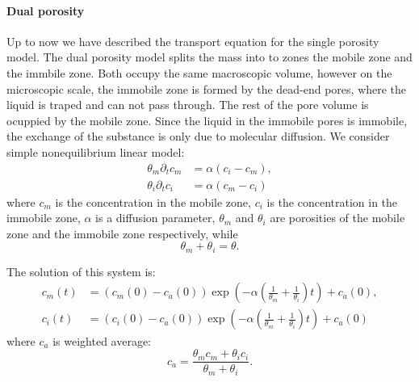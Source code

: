 \paragraph{Dual porosity}
Up to now we have described the transport equation for the single porosity model. The dual porosity model splits the mass into to zones the mobile zone and the immbile zone. 
Both occupy the same macroscopic volume, however on the microscopic scale, the immobile zone is formed by the dead-end pores, where the liquid is traped and can not pass through.
The rest of the pore volume is ocuppied by the mobile zone. Since the liquid in the immobile pores is immobile, the exchange of the substance is only due to molecular diffusion.
We consider simple nonequilibrium linear model:
\begin{align}
    \theta_m \partial_t c_m &= \alpha ( c_i - c_m), \\
    \theta_i \partial_t c_i &= \alpha ( c_m - c_i) 
\end{align}
where $c_m$ is the concentration in the mobile zone, $c_i$ is the concentration in the immobile zone, $\alpha$ is a diffusion parameter, $\theta_m$ and $\theta_i$ are porosities of the mobile zone and the immobile zone respectively, while 
\[
  \theta_m +\theta_i =\theta.
\]

The solution of this system is:
\begin{align}
     c_m(t) &= (c_m(0) - c_a(0)) \exp(- \alpha(\frac{1}{\theta_m} + \frac{1}{\theta_i}) t) + c_a(0), \\
     c_i(t) &= (c_i(0) - c_a(0)) \exp(- \alpha(\frac{1}{\theta_m} + \frac{1}{\theta_i}) t) + c_a(0)
\end{align}
where $c_a$ is weighted average:
\[
  c_a = \frac{\theta_m c_m + \theta_i c_i}{\theta_m + \theta_i}.
\]








